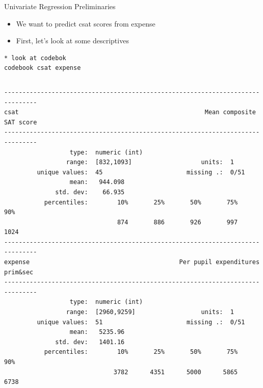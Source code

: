 \documentclass[table,smaller]{beamer}
\begin{document}
\begin{frame}[fragile,label=sec-2-2]{Univariate Regression Preliminaries}
 \begin{itemize}
\item We want to predict csat scores from expense
\item First, let's look at some descriptives
\end{itemize}

\begin{verbatim}
* look at codebok
codebook csat expense
\end{verbatim}

\vspace{-.5em}
\begin{columns}
\begin{block}{}
\begin{verbatim}
-------------------------------------------------------------------------------
csat                                                   Mean composite SAT score
-------------------------------------------------------------------------------
                  type:  numeric (int)
                 range:  [832,1093]                   units:  1
         unique values:  45                       missing .:  0/51
                  mean:   944.098
              std. dev:    66.935
           percentiles:        10%       25%       50%       75%       90%
                               874       886       926       997      1024
-------------------------------------------------------------------------------
expense                                         Per pupil expenditures prim&sec
-------------------------------------------------------------------------------
                  type:  numeric (int)
                 range:  [2960,9259]                  units:  1
         unique values:  51                       missing .:  0/51
                  mean:   5235.96
              std. dev:   1401.16
           percentiles:        10%       25%       50%       75%       90%
                              3782      4351      5000      5865      6738
\end{verbatim}
\end{block}
\end{columns}
\vspace{.5em}
\end{frame}
\end{document}

